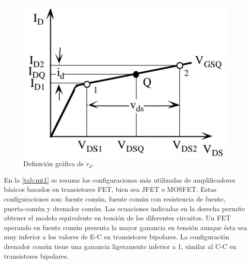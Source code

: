 \documentclass[12pt, a4paper]{article}
\begin{document}
    \begin{figure}[h!]
        \centering
        \includegraphics[height=5cm\textwidth]{grafrd.jpg}
        \caption{Definición gráfica de $r_d$.}
        \label{fig:mt3}
    \end{figure}

    En la \ref{tab:mt1} se resume los configuraciones más utilizadas de amplificadores básicos basados en transistores FET, bien sea JFET o MOSFET. Estas configuraciones son: fuente común, fuente común con resistencia de fuente, puerta-común y drenador común. Las ecuaciones indicadas en la derecha permite obtener el modelo equivalente en tensión de los diferentes circuitos. Un FET operando en fuente común presenta la mayor ganancia en tensión aunque ésta sea muy inferior a los valores de E-C en transistores bipolares. La configuración drenador común tiene una ganancia ligeramente inferior a 1, similar al C-C en transistores bipolares.
\end{document}
